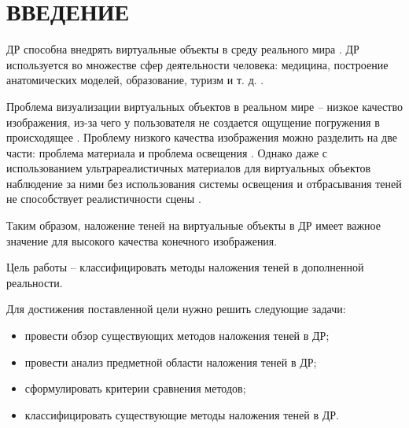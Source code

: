 \chapter*{ВВЕДЕНИЕ}

ДР способна внедрять виртуальные объекты в среду реального мира \cite{rtsm}. ДР используется во множестве сфер деятельности человека: медицина, построение анатомических моделей, образование, туризм и т. д. \cite{tech-ar}.

Проблема визуализации виртуальных объектов в реальном мире -- низкое качество изображения, из-за чего у пользователя не создается ощущение погружения в происходящее \cite{rtsm}. Проблему низкого качества изображения можно разделить на две части: проблема материала и проблема освещения \cite{rtsm}. Однако даже с использованием ультрареалистичных материалов для виртуальных объектов наблюдение за ними без использования системы освещения и отбрасывания теней не способствует реалистичности сцены \cite{rtsm}.

Таким образом, наложение теней на виртуальные объекты в ДР имеет важное значение для высокого качества конечного изображения.

Цель работы -- классифицировать методы наложения теней в дополненной реальности.

Для достижения поставленной цели нужно решить следующие задачи:

\begin{itemize}
	\item провести обзор существующих методов наложения теней в ДР;
	\item провести анализ предметной области наложения теней в ДР;
	\item сформулировать критерии сравнения методов;
	\item классифицировать существующие методы наложения теней в ДР.
\end{itemize}
